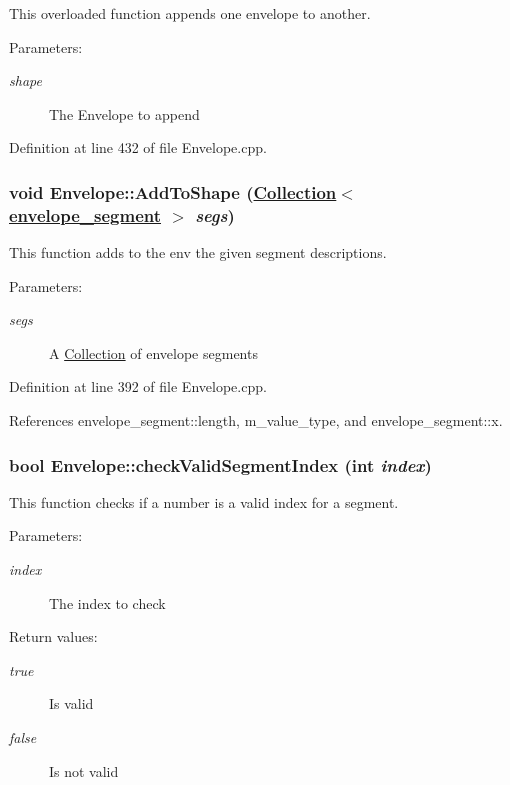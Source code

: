 This overloaded function appends one envelope to another. \begin{Desc}
\item[Parameters:]
\begin{description}
\item[{\em shape}]The Envelope to append \end{description}
\end{Desc}


Definition at line 432 of file Envelope.cpp.\hypertarget{classEnvelope_a9}{
\subsubsection[AddToShape]{\setlength{\rightskip}{0pt plus 5cm}void Envelope::Add\-To\-Shape (\hyperlink{classCollection}{Collection}$<$ \hyperlink{structenvelope__segment}{envelope\_\-segment} $>$ {\em segs})}}
\label{classEnvelope_a9}


This function adds to the env the given segment descriptions. \begin{Desc}
\item[Parameters:]
\begin{description}
\item[{\em segs}]A \hyperlink{classCollection}{Collection} of envelope segments \end{description}
\end{Desc}


Definition at line 392 of file Envelope.cpp.

References envelope\_\-segment::length, m\_\-value\_\-type, and envelope\_\-segment::x.\hypertarget{classEnvelope_d2}{
\subsubsection[checkValidSegmentIndex]{\setlength{\rightskip}{0pt plus 5cm}bool Envelope::check\-Valid\-Segment\-Index (int {\em index})}}
\label{classEnvelope_d2}


This function checks if a number is a valid index for a segment. \begin{Desc}
\item[Parameters:]
\begin{description}
\item[{\em index}]The index to check \end{description}
\end{Desc}
\begin{Desc}
\item[Return values:]
\begin{description}
\item[{\em true}]Is valid \item[{\em false}]Is not valid \end{description}
\end{Desc}


